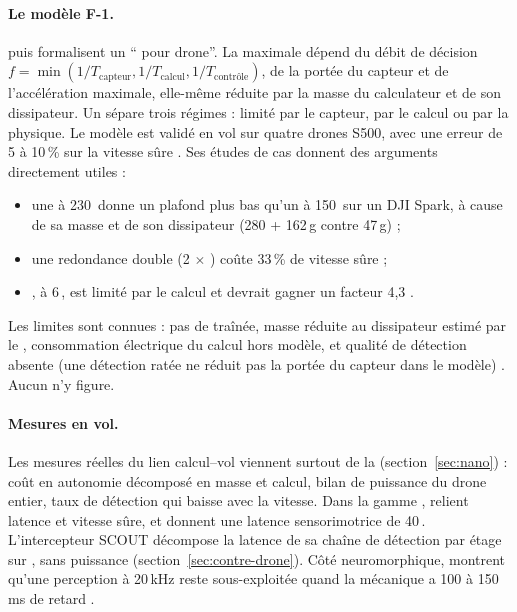 \paragraph{Le modèle F-1.} \citet{2020-krishnan-sky-not-limit-visual-performance} puis
\citet{arxiv-2204.10898-roofline-model-uavs-bottleneck-analysis}\pp{} formalisent un
\enquote{ pour drone}. La  maximale dépend du débit de décision
$f = \min(1/T_\text{capteur}, 1/T_\text{calcul}, 1/T_\text{contrôle})$, de la portée du
capteur et de l'accélération maximale, elle-même réduite par la masse du calculateur et de
son dissipateur. Un  sépare trois régimes : limité par le capteur, par le
calcul ou par la physique. Le modèle est validé en vol sur quatre drones S500, avec une
erreur de 5 à 10\,\% sur la vitesse sûre \citep[Fig.~7b]{arxiv-2204.10898-roofline-model-uavs-bottleneck-analysis}.
Ses études de cas donnent des arguments directement utiles :
\begin{itemize}
  \item une  à 230\, donne un plafond plus bas qu'un  à 150\, sur
    un DJI Spark, à cause de sa masse et de son dissipateur (280 + 162\,g contre 47\,g)
     ;
  \item une redondance double (2 $\times$ ) coûte 33\,\% de vitesse sûre  ;
  \item {}, à 6\,, est limité par le calcul et devrait gagner un facteur 4,3
    .
\end{itemize}
Les limites sont connues : pas de traînée, masse réduite au dissipateur estimé par le ,
consommation électrique du calcul hors modèle, et qualité de détection absente (une
détection ratée ne réduit pas la portée du capteur dans le modèle) \deduit. Aucun 
n'y figure.

\paragraph{Mesures en vol.} Les mesures réelles du lien calcul--vol viennent surtout de la
 (section~\ref{sec:nano}) : coût en autonomie décomposé en masse et calcul, bilan
de puissance du drone entier, taux de détection qui baisse avec la vitesse. Dans la gamme
, \citet{arxiv-2110.05113-learning-high-speed-flight-wild} relient latence et vitesse
sûre, et \citet{2023-kaufmann-champion-level-drone-racing-deep} donnent une latence
sensorimotrice de 40\,. L'intercepteur SCOUT
\citep[Table~IV]{arxiv-2609.21005-project-scout-interceptor-drone-perimeter}\pp{} décompose
la latence de sa chaîne de détection par étage sur , sans puissance
(section~\ref{sec:contre-drone}). Côté neuromorphique,
\citet{arxiv-2108.03694-event-driven-vision-control-uavs}\pp{} montrent qu'une perception
à 20\,kHz reste sous-exploitée quand la mécanique a 100 à 150\,ms de retard .

